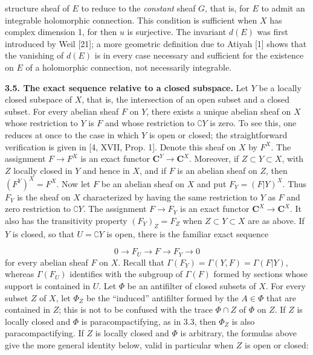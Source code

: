 
structure sheaf of $E$ to reduce to the \textit{constant} sheaf $G$, that is,
for $E$ to admit an integrable holomorphic connection. This condition is
sufficient when $X$ has complex dimension 1, for then $u$ is surjective. The
invariant $d(E)$ was first introduced by Weil [21]; a more geometric
definition due to Atiyah [1] shows that the vanishing of $d(E)$ is in every
case necessary and sufficient for the existence on $E$ of a holomorphic
connection, not necessarily integrable.

\indent\textbf{3.5. The exact sequence relative to a closed subspace.} Let $Y$ be a
locally closed subspace of $X$, that is, the intersection of an open subset
and a closed subset. For every abelian sheaf $F$ on $Y$, there exists a unique
abelian sheaf on $X$ whose restriction to $Y$ is $F$ and whose restriction to
$\complement Y$ is zero. To see this, one reduces at once to the case in which $Y$ is
open or closed; the straightforward verification is given in [4, XVII,
Prop. 1].
Denote this sheaf on $X$ by $F^X$. The assignment
$F\to F^X$ is an exact functor $\mathbf C^Y\to \mathbf C^X$. Moreover,
if $Z\subset Y\subset X$, with $Z$ locally closed in $Y$ and hence in $X$,
and if $F$ is an abelian sheaf on $Z$, then
$(F^Y)^X=F^X$.
Now let $F$ be an abelian sheaf on $X$ and put $F_Y=(F\vert Y)^X$. Thus $F_Y$
is the sheaf on $X$ characterized by having the same restriction to $Y$ as
$F$ and zero restriction to $\complement Y$. The assignment $F\to F_Y$ is an
exact functor $\mathbf C^X\to \mathbf C^X$. It also has the transitivity property
$(F_Y)_Z=F_Z$
when $Z\subset Y\subset X$ are as above. If $Y$ is closed, so that $U=\complement Y$ is
open, there is the familiar exact sequence

\[
0\to F_U\to F\to F_Y\to0
\]
for every abelian sheaf $F$ on $X$. Recall that
$\Gamma(F_Y)=\Gamma(Y,F)=\Gamma(F\vert Y)$, whereas $\Gamma(F_U)$ identifies
with the subgroup of $\Gamma(F)$ formed by sections whose support is contained
in $U$.
Let $\Phi$ be an antifilter of closed subsets of $X$. For every subset $Z$ of
$X$, let $\Phi_Z$ be the ``induced'' antifilter formed by the $A\in\Phi$ that
are contained in $Z$; this is not to be confused with the trace
$\Phi\cap Z$ of $\Phi$ on $Z$. If $Z$ is locally closed and $\Phi$ is
paracompactifying, as in 3.3, then $\Phi_Z$ is also paracompactifying. If $Z$
is locally closed and $\Phi$ is arbitrary, the formulas above give the more
general identity below, valid in particular when $Z$ is open or closed:

